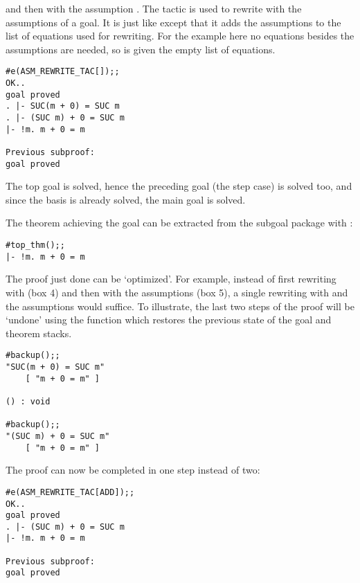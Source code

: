 \noindent and then with the assumption . The tactic
 is used to rewrite with the assumptions of a goal. It is
just like  except that it adds the assumptions to the list of
equations used for rewriting. For the example here no equations besides the
assumptions are needed, so  is given the empty list of
equations.

\begin{session}\begin{verbatim}
#e(ASM_REWRITE_TAC[]);;
OK..
goal proved
. |- SUC(m + 0) = SUC m
. |- (SUC m) + 0 = SUC m
|- !m. m + 0 = m

Previous subproof:
goal proved
\end{verbatim}\end{session}

\noindent The top goal is solved, hence the preceding goal (the step case)
is solved too, and since the basis is already solved, the main goal is solved.

The theorem achieving the goal can be extracted from the subgoal package with
:

\begin{session}\begin{verbatim}
#top_thm();;
|- !m. m + 0 = m
\end{verbatim}\end{session}

The proof just done can be `optimized'. For example, instead
of first rewriting with  (box 4) and then with the assumptions
(box 5), a single rewriting with  and the assumptions would suffice.
To illustrate, the last two steps of the proof will be `undone' using the function
 which restores the previous state of the goal and theorem stacks.

\begin{session}\begin{verbatim}
#backup();;
"SUC(m + 0) = SUC m"
    [ "m + 0 = m" ]

() : void

#backup();;
"(SUC m) + 0 = SUC m"
    [ "m + 0 = m" ]
\end{verbatim}\end{session}

\noindent The proof can now be completed in one step instead of two:

\begin{session}\begin{verbatim}
#e(ASM_REWRITE_TAC[ADD]);;
OK..
goal proved
. |- (SUC m) + 0 = SUC m
|- !m. m + 0 = m

Previous subproof:
goal proved
\end{verbatim}\end{session}



